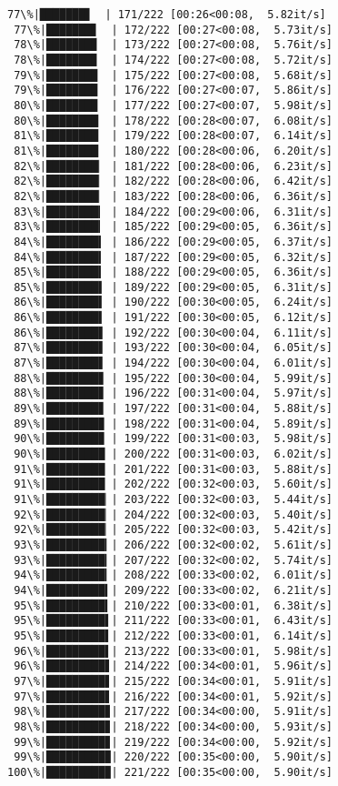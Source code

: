 \documentclass[11pt]{article}
\begin{document}
\begin{Verbatim}[commandchars=\\\{\}]
 77\%|███████▋  | 171/222 [00:26<00:08,  5.82it/s]
 77\%|███████▋  | 172/222 [00:27<00:08,  5.73it/s]
 78\%|███████▊  | 173/222 [00:27<00:08,  5.76it/s]
 78\%|███████▊  | 174/222 [00:27<00:08,  5.72it/s]
 79\%|███████▉  | 175/222 [00:27<00:08,  5.68it/s]
 79\%|███████▉  | 176/222 [00:27<00:07,  5.86it/s]
 80\%|███████▉  | 177/222 [00:27<00:07,  5.98it/s]
 80\%|████████  | 178/222 [00:28<00:07,  6.08it/s]
 81\%|████████  | 179/222 [00:28<00:07,  6.14it/s]
 81\%|████████  | 180/222 [00:28<00:06,  6.20it/s]
 82\%|████████▏ | 181/222 [00:28<00:06,  6.23it/s]
 82\%|████████▏ | 182/222 [00:28<00:06,  6.42it/s]
 82\%|████████▏ | 183/222 [00:28<00:06,  6.36it/s]
 83\%|████████▎ | 184/222 [00:29<00:06,  6.31it/s]
 83\%|████████▎ | 185/222 [00:29<00:05,  6.36it/s]
 84\%|████████▍ | 186/222 [00:29<00:05,  6.37it/s]
 84\%|████████▍ | 187/222 [00:29<00:05,  6.32it/s]
 85\%|████████▍ | 188/222 [00:29<00:05,  6.36it/s]
 85\%|████████▌ | 189/222 [00:29<00:05,  6.31it/s]
 86\%|████████▌ | 190/222 [00:30<00:05,  6.24it/s]
 86\%|████████▌ | 191/222 [00:30<00:05,  6.12it/s]
 86\%|████████▋ | 192/222 [00:30<00:04,  6.11it/s]
 87\%|████████▋ | 193/222 [00:30<00:04,  6.05it/s]
 87\%|████████▋ | 194/222 [00:30<00:04,  6.01it/s]
 88\%|████████▊ | 195/222 [00:30<00:04,  5.99it/s]
 88\%|████████▊ | 196/222 [00:31<00:04,  5.97it/s]
 89\%|████████▊ | 197/222 [00:31<00:04,  5.88it/s]
 89\%|████████▉ | 198/222 [00:31<00:04,  5.89it/s]
 90\%|████████▉ | 199/222 [00:31<00:03,  5.98it/s]
 90\%|█████████ | 200/222 [00:31<00:03,  6.02it/s]
 91\%|█████████ | 201/222 [00:31<00:03,  5.88it/s]
 91\%|█████████ | 202/222 [00:32<00:03,  5.60it/s]
 91\%|█████████▏| 203/222 [00:32<00:03,  5.44it/s]
 92\%|█████████▏| 204/222 [00:32<00:03,  5.40it/s]
 92\%|█████████▏| 205/222 [00:32<00:03,  5.42it/s]
 93\%|█████████▎| 206/222 [00:32<00:02,  5.61it/s]
 93\%|█████████▎| 207/222 [00:32<00:02,  5.74it/s]
 94\%|█████████▎| 208/222 [00:33<00:02,  6.01it/s]
 94\%|█████████▍| 209/222 [00:33<00:02,  6.21it/s]
 95\%|█████████▍| 210/222 [00:33<00:01,  6.38it/s]
 95\%|█████████▌| 211/222 [00:33<00:01,  6.43it/s]
 95\%|█████████▌| 212/222 [00:33<00:01,  6.14it/s]
 96\%|█████████▌| 213/222 [00:33<00:01,  5.98it/s]
 96\%|█████████▋| 214/222 [00:34<00:01,  5.96it/s]
 97\%|█████████▋| 215/222 [00:34<00:01,  5.91it/s]
 97\%|█████████▋| 216/222 [00:34<00:01,  5.92it/s]
 98\%|█████████▊| 217/222 [00:34<00:00,  5.91it/s]
 98\%|█████████▊| 218/222 [00:34<00:00,  5.93it/s]
 99\%|█████████▊| 219/222 [00:34<00:00,  5.92it/s]
 99\%|█████████▉| 220/222 [00:35<00:00,  5.90it/s]
100\%|█████████▉| 221/222 [00:35<00:00,  5.90it/s]
    \end{Verbatim}
\end{document}
